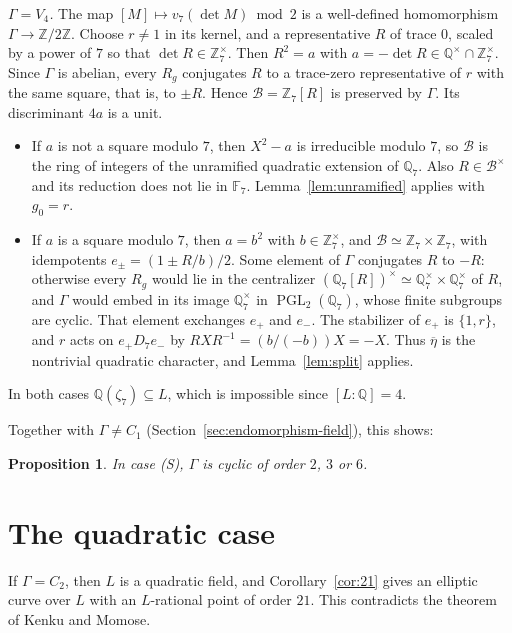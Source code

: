 \documentclass[11pt]{article}
\newtheorem{proposition}[lemma]{Proposition}
\newcommand{\Q}{\mathbb Q}
\newcommand{\Z}{\mathbb Z}
\newcommand{\F}{\mathbb F}
\DeclareMathOperator{\PGL}{PGL}
\begin{document}
\emph{\(\Gamma=V_4\).} The map \([M]\mapsto v_7(\det M)\bmod2\) is a
well-defined homomorphism \(\Gamma\to\Z/2\Z\). Choose \(r\neq1\) in its
kernel, and a representative \(R\) of trace \(0\), scaled by a power of
\(7\) so that \(\det R\in\Z_7^\times\). Then \(R^2=a\) with
\(a=-\det R\in\Q^\times\cap\Z_7^\times\). Since \(\Gamma\) is abelian,
every \(R_g\) conjugates \(R\) to a trace-zero representative of \(r\)
with the same square, that is, to \(\pm R\). Hence
\(\mathcal B=\Z_7[R]\) is preserved by \(\Gamma\). Its discriminant
\(4a\) is a unit.
\begin{itemize}
\item If \(a\) is not a square modulo \(7\), then \(X^2-a\) is
irreducible modulo \(7\), so \(\mathcal B\) is the ring of integers of
the unramified quadratic extension of \(\Q_7\). Also
\(R\in\mathcal B^\times\) and its reduction does not lie in \(\F_7\).
Lemma~\ref{lem:unramified} applies with \(g_0=r\).
\item If \(a\) is a square modulo \(7\), then \(a=b^2\) with
\(b\in\Z_7^\times\), and \(\mathcal B\simeq\Z_7\times\Z_7\), with
idempotents \(e_\pm=(1\pm R/b)/2\). Some element of \(\Gamma\)
conjugates \(R\) to \(-R\): otherwise every \(R_g\) would lie in the
centralizer \((\Q_7[R])^\times\simeq\Q_7^\times\times\Q_7^\times\) of
\(R\), and \(\Gamma\) would embed in its image \(\Q_7^\times\) in
\(\PGL_2(\Q_7)\), whose finite subgroups are cyclic. That element
exchanges \(e_+\) and \(e_-\). The stabilizer of \(e_+\) is
\(\{1,r\}\), and \(r\) acts on \(e_+D_7e_-\) by
\(RXR^{-1}=(b/(-b))X=-X\). Thus \(\overline\eta\) is the nontrivial
quadratic character, and Lemma~\ref{lem:split} applies.
\end{itemize}
In both cases \(\Q(\zeta_7)\subseteq L\), which is impossible since
\([L:\Q]=4\).

Together with \(\Gamma\neq C_1\) (Section~\ref{sec:endomorphism-field}),
this shows:

\begin{proposition}\label{prop:cyclic}
In case \textup{(S)}, \(\Gamma\) is cyclic of order \(2\), \(3\) or
\(6\).
\end{proposition}

\section{The quadratic case}\label{sec:quadratic}

If \(\Gamma=C_2\), then \(L\) is a quadratic field, and
Corollary~\ref{cor:21} gives an elliptic curve over \(L\) with an
\(L\)-rational point of order \(21\). This contradicts the theorem of
Kenku and Momose.
\end{document}
